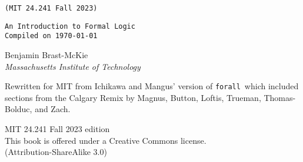 \thispagestyle{empty}
{\Huge\forallx} \hfill {\LARGE \texttt{(MIT 24.241 Fall 2023)}} %

{\tt An Introduction to Formal Logic\\
Compiled on \today}

\vspace{.5in}



{\sf Benjamin Brast-McKie}\\
\emph{Massachusetts Institute of Technology}




{\sf Rewritten for MIT from Ichikawa and Mangus' version of {\tt forall}\ which included sections from the Calgary Remix by Magnus, Button, Loftis, Trueman, Thomas-Bolduc, and Zach.}





\vfill




{\sf
	MIT 24.241 Fall 2023 edition \\%
	This book is offered under a Creative Commons license.\\
	(Attribution-ShareAlike 3.0)
}



\newpage
\thispagestyle{empty}%


%

